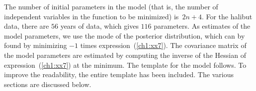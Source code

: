 \documentclass{admbmanual}
\begin{document}
The number of initial parameters in the model (that is, the number of
independent variables in the function to be minimized) is~$2n+4$. For the
halibut data, there are $56$ years of data, which gives $116$ parameters. As
estimates of the model parameters, we use the mode of the posterior
distribution, which can by found by minimizing $-1$ times
expression~(\ref{ch1:xx7}).
The covariance matrix of the model parameters are estimated by computing the
inverse of the Hessian of expression~(\ref{ch1:xx7})
at the minimum. The template for the model follows. To improve the readability,
the entire template has been included. The various sections are discussed below.
\end{document}
